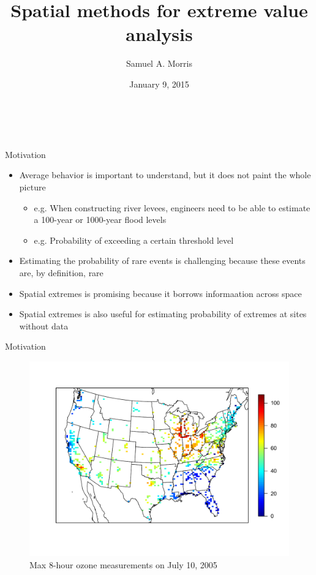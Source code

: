 \documentclass{beamer}
\title[Spatial methods for EVA] %
{
  Spatial methods for extreme value analysis
}
\author[S. Morris]{Samuel A. Morris}
\institute[]{North Carolina State University}
\date[]{January 9, 2015}
\begin{document}
\begin{frame}\frametitle{\ }
\begin{center}
  \maketitle
\end{center}
\end{frame}

\begin{frame}{Motivation}
  \begin{itemize} \setlength{\itemsep}{1em}
    \item Average behavior is important to understand, but it does not paint the whole picture
    \begin{itemize}
      \item e.g. When constructing river levees, engineers need to be able to estimate a 100-year or 1000-year flood levels
      \item e.g. Probability of exceeding a certain threshold level
    \end{itemize}
    \item Estimating the probability of rare events is challenging because these events are, by definition, rare
    \item Spatial extremes is promising because it borrows informaation across space
    \item Spatial extremes is also useful for estimating probability of extremes at sites without data
  \end{itemize}
\end{frame}

\begin{frame}{Motivation}
  \centering
  \begin{figure}
    \includegraphics[width=\linewidth, trim=0 1in 0 1in ]{./plots/pot/ozone-10jul-us.pdf}
    \caption{Max 8-hour ozone measurements on July 10, 2005}
   \end{figure}
\end{frame}
\end{document}
